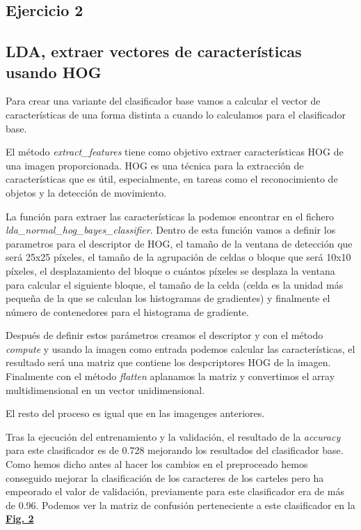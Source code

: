 \documentclass[a4paper, 12pt]{article}
\begin{document}
\subsection{Ejercicio 2}

\subsection{LDA, extraer vectores de características usando HOG}
Para crear una variante del clasificador base vamos a calcular el vector de características de una forma distinta a cuando lo calculamos para el clasificador base. 

El método \textit{extract\_features} tiene como objetivo extraer características HOG de una imagen proporcionada. HOG es una técnica para la extracción de características que es útil, especialmente, en tareas como el reconocimiento de objetos y la detección de movimiento.

La función para extraer las características la podemos encontrar en el fichero \\\textit{lda\_normal\_hog\_bayes\_classifier}. Dentro de esta función vamos a definir los parametros para el descriptor de HOG, el tamaño de la ventana de detección que será 25x25 píxeles, el tamaño de la agrupación de celdas o bloque que será 10x10 píxeles, el desplazamiento del bloque o cuántos píxeles se desplaza la ventana para calcular el siguiente bloque, el tamaño de la celda (celda es la unidad más pequeña de la que se calculan los histogramas de gradientes) y finalmente el número de contenedores para el histograma de gradiente. 

Después de definir estos parámetros creamos el descriptor y con el método \textit{compute} y usando la imagen como entrada podemos calcular las características, el resultado será una matriz que contiene los despcriptores HOG de la imagen. Finalmente con el método \textit{flatten} aplanamos la matriz y convertimos el array multidimensional en un vector unidimensional. 

El resto del proceso es igual que en las imagenges anteriores. 

Tras la ejecución del entrenamiento y la validación, el resultado de la \textit{accuracy} para este clasificador es de 0.728 mejorando los resultados del clasificador base. Como hemos dicho antes al hacer los cambios en el preproceado hemos conseguido mejorar la clasificación de los caracteres de los carteles pero ha empeorado el valor de validación, previamente para este clasificador era de más de 0.96. Podemos ver la matriz de confusión perteneciente a este clasificador en la  \textbf{\hyperref[fig:normalizacion]{Fig. 2}}
\end{document}
